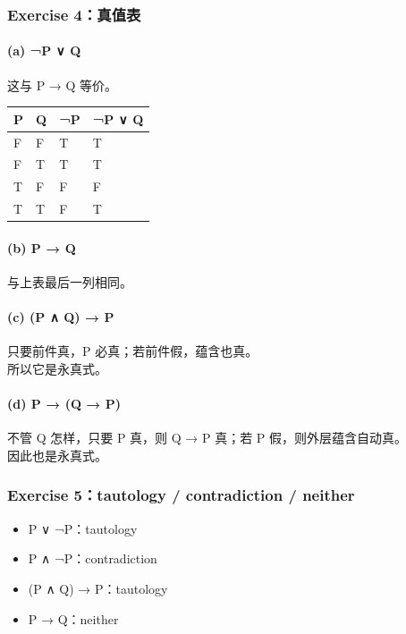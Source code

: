 \documentclass[
  11pt,
]{article}
\providecommand{\tightlist}{%
  \setlength{\itemsep}{0pt}\setlength{\parskip}{0pt}}
\begin{document}
\subsubsection{Exercise 4：真值表}\label{exercise-4ux771fux503cux8868}

\paragraph{(a) ¬P ∨ Q}\label{a-p-q}

这与 P → Q 等价。

\begin{longtable}[]{@{}llll@{}}
\toprule\noalign{}
P & Q & ¬P & ¬P ∨ Q \\
\midrule\noalign{}
\endhead
\bottomrule\noalign{}
\endlastfoot
F & F & T & T \\
F & T & T & T \\
T & F & F & F \\
T & T & F & T \\
\end{longtable}

\paragraph{(b) P → Q}\label{b-p-q}

与上表最后一列相同。

\paragraph{(c) (P ∧ Q) → P}\label{c-p-q-p}

只要前件真，P 必真；若前件假，蕴含也真。\\
所以它是永真式。

\paragraph{(d) P → (Q → P)}\label{d-p-q-p}

不管 Q 怎样，只要 P 真，则 Q → P 真；若 P 假，则外层蕴含自动真。\\
因此也是永真式。

\subsubsection{Exercise 5：tautology / contradiction /
neither}\label{exercise-5tautology-contradiction-neither}

\begin{itemize}
\tightlist
\item
  P ∨ ¬P：tautology
\item
  P ∧ ¬P：contradiction
\item
  (P ∧ Q) → P：tautology
\item
  P → Q：neither
\end{itemize}
\end{document}
